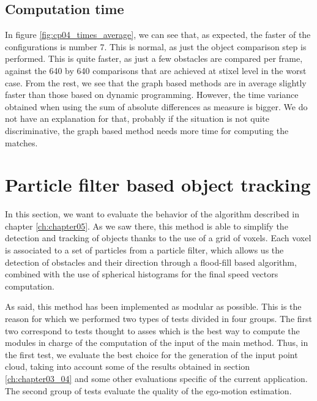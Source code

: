 \subsection{Computation time}\label{ch:chapter04_02_04}

In figure \ref{fig:cp04_times_average}, we can see that, as expected, the faster of the configurations is number 7. This is normal, as just the object comparison step is performed. This is quite faster, as just a few obstacles are compared per frame, against the 640 by 640 comparisons that are achieved at stixel level in the worst case. From the rest, we see that the graph based methods are in average slightly faster than those based on dynamic programming. However, the time variance obtained when using the sum of absolute differences as measure is bigger. We do not have an explanation for that, probably if the situation is not quite discriminative, the graph based method needs more time for computing the matches.

\FloatBarrier

\graphicspath{{./images/chapter05/bmps/}{./images/chapter05/vects/}{./images/chapter05/}}
\section{Particle filter based object tracking}\label{ch:chapter05_02}

In this section, we want to evaluate the behavior of the algorithm described in chapter \ref{ch:chapter05}. As we saw there, this method is able to simplify the detection and tracking of objects thanks to the use of a grid of voxels. Each voxel is associated to a set of particles from a particle filter, which allows us the detection of obstacles and their direction through a flood-fill based algorithm,  combined with the use of spherical histograms for the final speed vectors computation.

As said, this method has been implemented as modular as possible. This is the reason for which we performed two types of tests divided in four groups. The first two correspond to tests thought to asses which is the best way to compute the modules in charge of the computation of the input of the main method. Thus, in the first test, we evaluate the best choice for the generation of the input point cloud, taking into account some of the results obtained in section \ref{ch:chapter03_04} and some other evaluations specific of the current application. The second group of tests evaluate the quality of the ego-motion estimation. 

